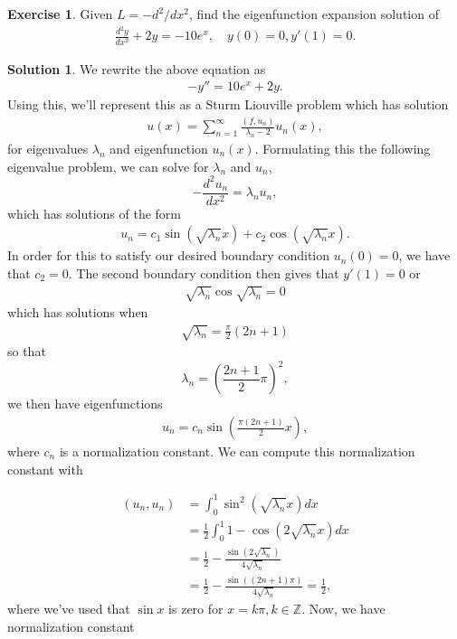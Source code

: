 \documentclass[12pt]{article}
\newcommand{\bbZ}{\mathbb{Z}}
\theoremstyle{definition}
\newtheorem{exer}{Exercise}
\newtheorem{sol}{Solution}
\theoremstyle{remark}
\begin{document}
\newpage

\begin{exer}
    Given $L = - d^{2} / dx^{2}$, find the eigenfunction expansion solution of 
    \begin{align*}
        \frac{d^{2} y}{dx^{2}} + 2y = - 10 e^{x}, \quad y(0) = 0, y'(1) = 0.
    \end{align*}
\end{exer}

\begin{sol}
We rewrite the above equation as
\begin{align*}
-y'' = 10e^{x} + 2y.
\end{align*}
Using this, we'll represent this as a Sturm Liouville problem which has solution
\begin{align*}
    u(x) = \sum_{n=1}^{\infty} \frac{(f, u_{n})}{\lambda_{n}-2}u_{n}(x),
\end{align*}
for eigenvalues $\lambda_{n}$ and eigenfunction $u_{n}(x)$. Formulating this the following eigenvalue problem, we can solve for $\lambda_n$ and $u_{n}$, 
\begin{equation*}
    - \frac{d^{2}u_{n}}{dx^{2}} = \lambda_{n} u_{n},
\end{equation*}
which has solutions of the form
\begin{align*}
    u_{n} = c_{1} \sin (\sqrt{\lambda_{n}} x) + c_{2} \cos (\sqrt{\lambda_{n}} x).
\end{align*}
In order for this to satisfy our desired boundary condition $u_{n}(0) = 0$, we have that $c_{2} = 0$. The second boundary condition then gives that $y'(1) = 0$ or 
\begin{align*}
    \sqrt{\lambda_{n}} \cos \sqrt{\lambda_{n}} = 0
\end{align*}
which has solutions when 
\begin{align*}
    \sqrt{\lambda_{n}} = \frac{\pi}{2} (2n + 1)
\end{align*}
so that
\begin{equation*}
    \lambda_{n} = \left( \frac{2n + 1}{2} \pi \right)^{2},
\end{equation*}
we then have eigenfunctions
\begin{align*}
    u_{n} = c_{n} \sin \left( \frac{\pi(2n + 1)}{2} x \right),
\end{align*}
where $c_{n}$ is a normalization constant. We can compute this normalization constant with

\begin{align*}
    (u_{n}, u_{n}) &= \int_{0}^{1} \sin^{2} \left( \sqrt{\lambda_{n}} x \right)dx\\
                         &= \frac{1}{2}\int_{0}^{1} 1 - \cos ( 2\sqrt{\lambda_{n}} x )dx\\
                         &= \frac{1}{2} - \frac{\sin(2\sqrt{\lambda_{n}})}{4\sqrt{\lambda_{n}}}\\
                         &= \frac{1}{2} - \frac{\sin ((2n+1) \pi)}{4\sqrt{\lambda_{n}}} = \frac{1}{2},
\end{align*}
where we've used that $\sin x$ is zero for $x = k\pi, k\in\bbZ$. Now, we have normalization constant


\end{sol}
\end{document}
